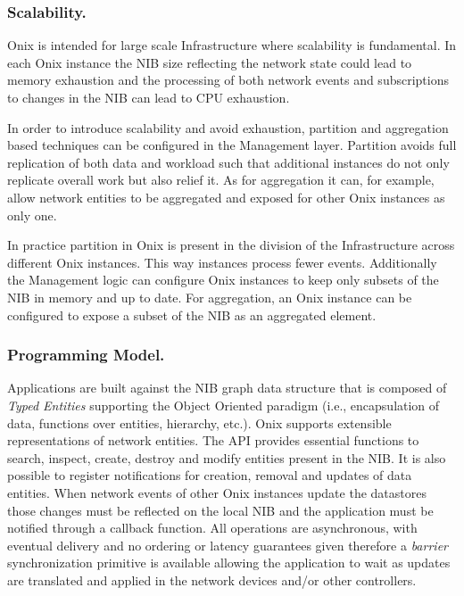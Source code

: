 \documentclass[12pt,openright,twoside]{report}
\begin{document}
\begin{itemize}
\subsubsection{Scalability.} Onix is intended for large scale Infrastructure where scalability is
fundamental. In each Onix instance the NIB
size reflecting the network state could lead to memory
exhaustion   and the processing of both network events and
subscriptions 
to changes in  the NIB can lead to CPU exhaustion.

In order to introduce scalability and avoid exhaustion, partition and
aggregation based techniques can be configured in the Management
layer. Partition avoids full replication of both data  and workload
such that additional instances do not only replicate overall work but
also relief it. As for aggregation it can, for example, allow network entities to be
aggregated and exposed for other Onix instances as only one.

In practice partition in Onix is present in the division of the
Infrastructure across different Onix instances. 
This way
instances process fewer events. Additionally the Management logic can
configure Onix instances to keep only subsets of the NIB in memory and
up to date. For aggregation, an Onix instance can be configured to
expose a subset of the NIB as an aggregated element. 

\subsubsection{Programming Model.} Applications are built against the NIB graph data structure that is
composed of \emph{Typed Entities} supporting the Object
Oriented paradigm (i.e., encapsulation of data, functions over
entities, hierarchy, etc.). Onix supports extensible representations of
network entities. The
API provides essential functions to search, inspect, create, destroy and
modify entities present in the NIB. It is also possible to register
notifications for creation, removal and updates of data
entities. When network events of other Onix instances update the
datastores those changes must be reflected on the local NIB and the
application must be notified through a callback function. 
All operations are asynchronous, with
eventual delivery and no ordering or latency guarantees given
therefore a \emph{barrier} synchronization primitive is available
allowing the application to wait as
updates are translated and applied in the network devices and/or other
controllers. 


\end{itemize}
\end{document}
